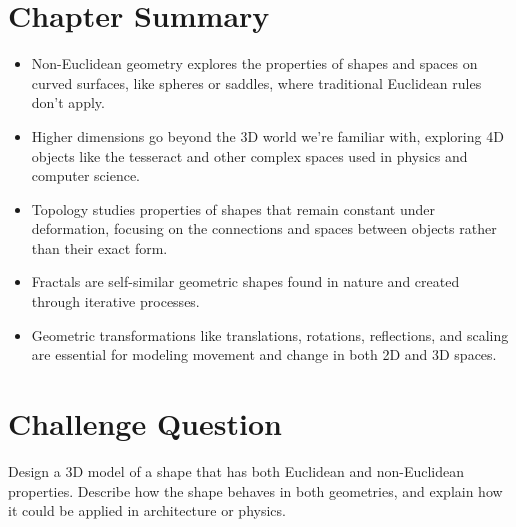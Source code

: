 \section{Chapter Summary}
\begin{itemize}
    \item Non-Euclidean geometry explores the properties of shapes and spaces on curved surfaces, like spheres or saddles, where traditional Euclidean rules don’t apply.
    \item Higher dimensions go beyond the 3D world we’re familiar with, exploring 4D objects like the tesseract and other complex spaces used in physics and computer science.
    \item Topology studies properties of shapes that remain constant under deformation, focusing on the connections and spaces between objects rather than their exact form.
    \item Fractals are self-similar geometric shapes found in nature and created through iterative processes.
    \item Geometric transformations like translations, rotations, reflections, and scaling are essential for modeling movement and change in both 2D and 3D spaces.
\end{itemize}

\section*{Challenge Question}
Design a 3D model of a shape that has both Euclidean and non-Euclidean properties. Describe how the shape behaves in both geometries, and explain how it could be applied in architecture or physics.